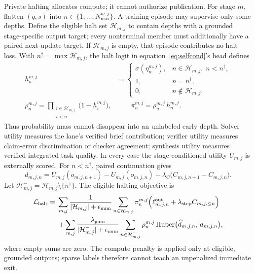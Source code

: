 \documentclass[10pt,a4paper]{article}
\newcommand{\op}[1]{\operatorname{#1}}
\newcommand{\eps}{\epsilon}
\newcommand{\Lcal}{\mathcal{L}}
\newcommand{\Hcal}{\mathcal{H}}
\begin{document}
Private halting allocates compute; it cannot authorize publication. For stage
$m$, flatten $(q, s)$ into $n \in \{1, \dots, N^{m,j}_{\max}\}$. A training
episode may supervise only some depths. Define the eligible halt set
$\Hcal_{m,j}$ to contain depths with a grounded stage-specific output target;
every nonterminal member must additionally have a paired next-update target.
If $\Hcal_{m,j}$ is empty, that episode contributes no halt loss. With
$n^\dagger = \max \Hcal_{m,j}$, the halt logit in
equation~\eqref{eq:selfcond}'s head defines
\begin{align}
h^{m,j}_n &=
\begin{cases}
\sigma(\eta^{m,j}_n), & n \in \Hcal_{m,j},\; n < n^\dagger, \\
1, & n = n^\dagger, \\
0, & n \notin \Hcal_{m,j},
\end{cases} \\
\rho^{m,j}_n = \prod_{\substack{i \in \Hcal_{m,j} \\ i < n}}
  \bigl( 1 - h^{m,j}_i \bigr),
&\qquad
\pi^{m,j}_n = \rho^{m,j}_n\, h^{m,j}_n .
\end{align}
Thus probability mass cannot disappear into an unlabeled early depth. Solver
utility measures the lane's verified brief contribution; verifier utility
measures claim-error discrimination or checker agreement; synthesis utility
measures verified integrated-task quality. In every case the stage-conditioned
utility $U_{m,j}$ is externally scored. For $n < n^\dagger$, paired
continuation gives
\begin{equation}
d_{m,j,n} = U_{m,j}(o_{m,j,n+1}) - U_{m,j}(o_{m,j,n})
  - \lambda_C \bigl( C_{m,j,n+1} - C_{m,j,n} \bigr).
\end{equation}
Let $\Hcal^-_{m,j} = \Hcal_{m,j} \setminus \{n^\dagger\}$. The eligible
halting objective is
\begin{equation}
\begin{aligned}
\Lcal_{\mathrm{halt}} ={}& \sum_{m,j} \frac{1}{|\Hcal_{m,j}| + \eps_{\mathrm{num}}}
  \sum_{n \in \Hcal_{m,j}} \pi^{m,j}_n
  \Bigl( \ell^{\mathrm{out}}_{m,j,n} + \lambda_{\mathrm{step}} C_{m,j,\le n} \Bigr) \\
&+ \sum_{m,j} \frac{\lambda_{\mathrm{gain}}}{|\Hcal^-_{m,j}| + \eps_{\mathrm{num}}}
  \sum_{n \in \Hcal^-_{m,j}} \rho^{m,j}_n
  \op{Huber}\bigl( \widehat{d}_{m,j,n},\, d_{m,j,n} \bigr),
\end{aligned}
\end{equation}
where empty sums are zero. The compute penalty is applied only at eligible,
grounded outputs; sparse labels therefore cannot teach an unpenalized
immediate exit.
\end{document}
